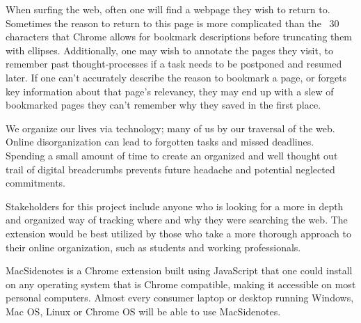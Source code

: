 \documentclass{article}
\begin{document}
	\begin{flushleft}
		
		When surfing the web, often one will find a webpage they wish to 
		return to. 
		Sometimes the reason to return to this page is more complicated than the ~30 
		characters that Chrome allows for bookmark descriptions before truncating them 
		with ellipses. Additionally, one may wish to annotate the pages they visit, to 
		remember past thought-processes if a task needs to be postponed and resumed 
		later. If one can’t accurately describe the reason to bookmark a page, or forgets key 
		information about that page’s relevancy, they may end up with a slew of bookmarked 
		pages they can’t remember why they saved in the first place.\par
		
		We organize our lives via technology; many of us by our traversal of the web. Online 
		disorganization can lead to forgotten tasks and missed deadlines. Spending a small 
		amount of time to create an organized and well thought out trail of digital 
		breadcrumbs prevents future headache and potential neglected commitments.\par
		
		Stakeholders for this project include anyone who is looking for a more in depth and 
		organized way of tracking where and why they were searching the web. The 
		extension would be best utilized by those who take a more thorough approach to 
		their online organization, such as students and working professionals.\par
		
		MacSidenotes is a Chrome extension built using JavaScript that one could install on 
		any operating system that is Chrome compatible, making it accessible on most 
		personal computers. Almost every consumer laptop or desktop running Windows, 
		Mac OS, Linux or Chrome OS will be able to use MacSidenotes.
		
		
	\end{flushleft}
		
	
	
\end{document}
